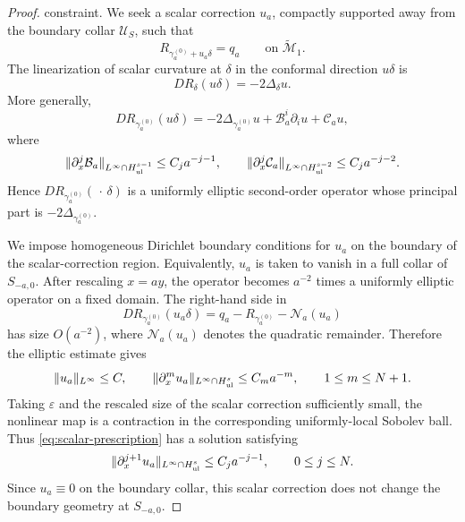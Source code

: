 \documentclass{amsart}
\begin{document}
{\begin{proof}
constraint. We seek a scalar correction \(u_a\), compactly supported
away from the boundary collar \(\mathcal U_S\), such that
\begin{equation}
\label{eq:scalar-prescription}
        R_{\gamma_a^{(0)}+u_a\delta}
        =
        q_a
        \qquad\text{on }\widetilde{\mathcal M}_1.
\end{equation}
The linearization of scalar curvature at \(\delta\) in the conformal
direction \(u\delta\) is
\[
        D R_\delta(u\delta)
        =
        -2\Delta_\delta u.
\]
More generally,
\[
        D R_{\gamma_a^{(0)}}(u\delta)
        =
        -2\Delta_{\gamma_a^{(0)}}u
        +
        \mathcal B_a^i\partial_i u
        +
        \mathcal C_a u,
\]
where
\[
        \|\partial_x^j\mathcal B_a\|_{L^\infty\cap H^{s-1}_{\rm ul}}
        \le C_j a^{-j-1},
        \qquad
        \|\partial_x^j\mathcal C_a\|_{L^\infty\cap H^{s-2}_{\rm ul}}
        \le C_j a^{-j-2}.
\]
Hence \(D R_{\gamma_a^{(0)}}(\,\cdot\,\delta)\) is a uniformly elliptic
second-order operator whose principal part is \(-2\Delta_{\gamma_a^{(0)}}\).

\noindent We impose homogeneous Dirichlet boundary conditions for \(u_a\) on the
boundary of the scalar-correction region. Equivalently, \(u_a\) is taken
to vanish in a full collar of \(S_{-a,0}\). After rescaling \(x=ay\),
the operator becomes \(a^{-2}\) times a uniformly elliptic operator on a
fixed domain. The right-hand side in
\[
        D R_{\gamma_a^{(0)}}(u_a\delta)
        =
        q_a-R_{\gamma_a^{(0)}}
        -
        \mathcal N_a(u_a)
\]
has size \(O(a^{-2})\), where \(\mathcal N_a(u_a)\) denotes the
quadratic remainder. Therefore the elliptic estimate gives
\[
        \|u_a\|_{L^\infty}\le C,
        \qquad
        \|\partial_x^m u_a\|_{L^\infty\cap H^{s}_{\rm ul}}
        \le C_m a^{-m},
        \qquad 1\le m\le N+1.
\]
Taking \(\varepsilon\) and the rescaled size of the scalar correction
sufficiently small, the nonlinear map is a contraction in the corresponding
uniformly-local Sobolev ball. Thus \eqref{eq:scalar-prescription} has a
solution satisfying
\begin{equation}
\label{eq:u-estimate}
        \|\partial_x^{j+1}u_a\|_{L^\infty\cap H^s_{\rm ul}}
        \le C_j a^{-j-1},
        \qquad 0\le j\le N.
\end{equation}
Since \(u_a\equiv0\) on the boundary collar, this scalar correction does
not change the boundary geometry at \(S_{-a,0}\).


\end{proof}}
\end{document}
